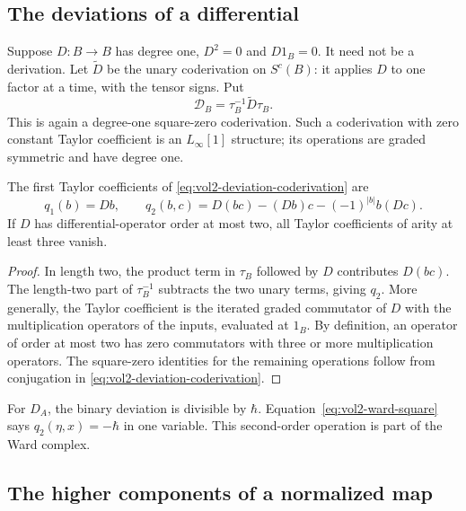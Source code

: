 \subsection{The deviations of a differential}

Suppose $D:B\to B$ has degree one, $D^2=0$ and $D1_B=0$.
It need not be a derivation. Let $\widetilde D$ be the unary
coderivation on $S^c(B)$: it applies $D$ to one factor at a
time, with the tensor signs. Put
\begin{equation}\label{eq:vol2-deviation-coderivation}
 \mathscr D_B=\tau_B^{-1}\widetilde D\tau_B.
\end{equation}
This is again a degree-one square-zero coderivation. Such a
coderivation with zero constant Taylor coefficient is an
$L_\infty[1]$ structure; its operations are graded symmetric
and have degree one.

\begin{proposition}\label{prop:vol2-multiplicative-deviations}
The first Taylor coefficients of \eqref{eq:vol2-deviation-coderivation}
are
\[
 q_1(b)=Db,\qquad
 q_2(b,c)=D(bc)-(Db)c-(-1)^{|b|}b(Dc).
\]
If $D$ has differential-operator order at most two, all Taylor
coefficients of arity at least three vanish.
\end{proposition}
\begin{proof}
In length two, the product term in $\tau_B$ followed by $D$
contributes $D(bc)$. The length-two part of $\tau_B^{-1}$
subtracts the two unary terms, giving $q_2$.
More generally, the Taylor coefficient is the iterated graded
commutator of $D$ with the multiplication operators of the
inputs, evaluated at $1_B$. By definition, an operator of order
at most two has zero commutators with three or more
multiplication operators. The square-zero identities for the
remaining operations follow from conjugation in
\eqref{eq:vol2-deviation-coderivation}.
\end{proof}

For $D_A$, the binary deviation is divisible by $\hbar$.
Equation~\eqref{eq:vol2-ward-square} says
$q_2(\eta,x)=-\hbar$ in one variable. This second-order
operation is part of the Ward complex.

\subsection{The higher components of a normalized map}

